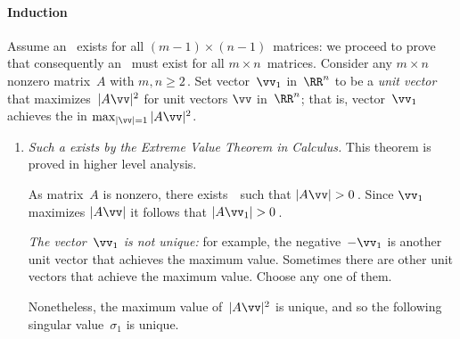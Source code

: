\paragraph{Induction}  
Assume  an \svd\ exists for all \((m-1)\times(n-1)\)~matrices: we proceed to prove that consequently an \svd\ must exist for all \(m\times n\)~matrices.
Consider any \(m\times n\) nonzero matrix~\(A\) with \(m,n\geq2\)\,.
Set vector~\(\vv_1\) in~\(\RR^n\) to be a \emph{unit vector} that maximizes~\(|A\vv|^2\) for unit vectors \(\vv\) in~\(\RR^n\); that is, vector~\(\vv_1\) achieves the  in \(\max_{|\vv|=1}|A\vv|^2\).
\begin{enumerate}
\item \emph{Such a  exists by the Extreme Value Theorem in Calculus.}
This theorem is proved in higher level analysis.

%
As matrix~\(A\) is nonzero, there exists~\vv\ such that \(|A\vv|>0\)\,.
Since \(\vv_1\) maximizes \(|A\vv|\) it follows that \(|A\vv_1|>0\)\,.

\emph{The vector~\(\vv_1\) is not unique:} for example, the negative~\(-\vv_1\) is another unit vector that achieves the maximum value.  
Sometimes there are other unit vectors that achieve the maximum value. 
Choose any one of them. 

Nonetheless, the maximum value of~\(|A\vv|^2\) is unique, and so the following singular value~\(\sigma_1\) is unique.


\end{enumerate}
